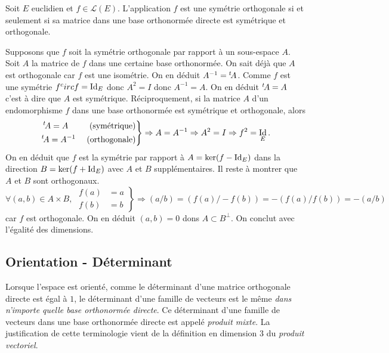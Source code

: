 \begin{prop}
 Soit $E$ euclidien et $f\in \mathcal L(E)$. L'application $f$ est une symétrie orthogonale si et seulement si sa matrice dans une base orthonormée directe est symétrique et orthogonale.
\end{prop}
\begin{demo}
  Supposons que $f$ soit la symétrie orthogonale par rapport à un sous-espace $A$. Soit $A$ la matrice de $f$ dans une certaine base orthonormée. On sait déjà que $A$ est orthogonale car $f$ est une isométrie. On en déduit $A^{-1} = \mathstrut^t\! A$. Comme $f$ est une symétrie $f^circ f= \mathop{\mathrm{Id}}_E$ donc $A^2 = I$ donc $A^{-1} = A$. On en déduit $\mathstrut^t\! A = A$ c'est à dire que $A$ est symétrique.\newline
  Réciproquement, si la matrice $A$ d'un endomorphisme $f$ dans une base orthonormée est symétrique et orthogonale, alors
  \[
   \left. 
   \begin{aligned}
    &\mathstrut^t\! A = A &\text{ (symétrique)}\\ \mathstrut^t\! &A = A^{-1} &\text{ (orthogonale)}
   \end{aligned}
\right\rbrace \Rightarrow A = A^{-1} \Rightarrow A^2 = I \Rightarrow f^2 = \mathop{\mathrm{Id}}_E.
  \]
On en déduit que $f$ est la symétrie par rapport à $A=\ker(f-\mathop{\mathrm{Id}}_E)$ dans la direction $B = \ker(f+\mathop{\mathrm{Id}}_E)$ avec $A$ et $B$ supplémentaires. Il reste à montrer que $A$ et $B$ sont orthogonaux.
\[
 \forall (a,b)\in A\times B,\;
 \left. 
 \begin{aligned}
  f(a) &= a \\ f(b) &= b
 \end{aligned}
\right\rbrace 
\Rightarrow (a/b) = (f(a)/-f(b)) = -(f(a)/f(b)) = -(a/b)
\]
car $f$ est orthogonale. On en déduit $(a,b)=0$ dons $A \subset B^{\bot}$. On conclut avec l'égalité des dimensions. 
\end{demo}

\subsection{Orientation - Déterminant}
Lorsque l'espace est orienté, comme le déterminant d'une matrice orthogonale directe est égal à $1$, le déterminant d'une famille de vecteurs est le même \emph{dans n'importe quelle base orthonormée directe}. Ce déterminant d'une famille de vecteurs dans une base orthonormée directe est appelé \emph{produit mixte}. La justification de cette terminologie vient de la définition en dimension $3$ du \emph{produit vectoriel}.
 
